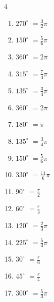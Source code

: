 \begin{multicols}{4}
\begin{enumerate}
  \item $\displaystyle 270^{\circ}$
        $\displaystyle =\frac{3}{2}\pi$

  \item $\displaystyle 150^{\circ}$
        $\displaystyle =\frac{5}{6}\pi$

  \item $\displaystyle 360^{\circ}$
        $\displaystyle =2\pi$

  \item $\displaystyle 315^{\circ}$
        $\displaystyle =\frac{7}{4}\pi$

  \item $\displaystyle 135^{\circ}$
        $\displaystyle =\frac{3}{4}\pi$

  \item $\displaystyle 360^{\circ}$
        $\displaystyle =2\pi$

  \item $\displaystyle 180^{\circ}$
        $\displaystyle =\pi$

  \item $\displaystyle 135^{\circ}$
        $\displaystyle =\frac{3}{4}\pi$

  \item $\displaystyle 150^{\circ}$
        $\displaystyle =\frac{5}{6}\pi$

  \item $\displaystyle 330^{\circ}$
        $\displaystyle =\frac{11}{6}\pi$

  \item $\displaystyle 90^{\circ}$
        $\displaystyle =\frac{\pi}{2}$

  \item $\displaystyle 60^{\circ}$
        $\displaystyle =\frac{\pi}{3}$

  \item $\displaystyle 120^{\circ}$
        $\displaystyle =\frac{2}{3}\pi$

  \item $\displaystyle 225^{\circ}$
        $\displaystyle =\frac{5}{4}\pi$

  \item $\displaystyle 30^{\circ}$
        $\displaystyle =\frac{\pi}{6}$

  \item $\displaystyle 45^{\circ}$
        $\displaystyle =\frac{\pi}{4}$

  \item $\displaystyle 300^{\circ}$
        $\displaystyle =\frac{5}{3}\pi$


\end{enumerate}
\end{multicols}
